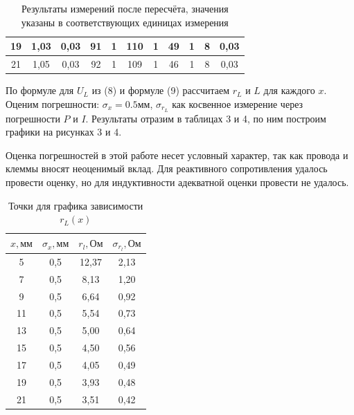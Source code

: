 \documentclass[a4paper, fontsize = 14pt]{article}
\begin{document}
\begin{table}[hbt]
{\begin{tabular}{|c|c|c|c|c|c|c|c|c|c|c|}
19               & 1,03            & 0,03                   & 91                & 1                          & 110                   & 1                              & 49                  & 1                          & 8                  & 0,03                        \\ \hline
21               & 1,05            & 0,03                   & 92                & 1                          & 109                   & 1                              & 46                  & 1                          & 8                  & 0,03                        \\ \hline
\end{tabular}
}
\caption{Результаты измерений после пересчёта, значения указаны в соответствующих единицах измерения}
\end{table}

По формуле для $U_L$ из (8) и формуле (9) рассчитаем $r_L$ и $L$ для каждого $x$.  Оценим погрешности: $\sigma_x = 0.5 мм$, $\sigma_{r_L}$ как косвенное измерение через погрешности $P$ и $I$. Результаты отразим в таблицах 3 и 4, по ним построим графики на рисунках 3 и 4.

Оценка погрешностей в этой работе несет условный характер, так как провода и клеммы вносят неоценимый вклад. Для реактивного сопротивления удалось провести оценку, но для индуктивности адекватной оценки провести не удалось.

\begin{table}[hbt]
\centering
\begin{tabular}{|c|c|c|c|}
\hline
\textbf{$x, мм$} & \textbf{$\sigma_x, мм$} & \textbf{$r_l, Ом$} & \textbf{$\sigma_{r_l}, Ом$} \\ \hline
5                & 0,5                     & 12,37              & 2,13                        \\ \hline
7                & 0,5                     & 8,13               & 1,20                        \\ \hline
9                & 0,5                     & 6,64               & 0,92                        \\ \hline
11               & 0,5                     & 5,54               & 0,73                        \\ \hline
13               & 0,5                     & 5,00               & 0,64                        \\ \hline
15               & 0,5                     & 4,50               & 0,56                        \\ \hline
17               & 0,5                     & 4,05               & 0,49                        \\ \hline
19               & 0,5                     & 3,93               & 0,48                        \\ \hline
21               & 0,5                     & 3,51               & 0,42                        \\ \hline
\end{tabular}
\caption{Точки для графика зависимости $r_L(x)$}
\end{table}
\end{document}
